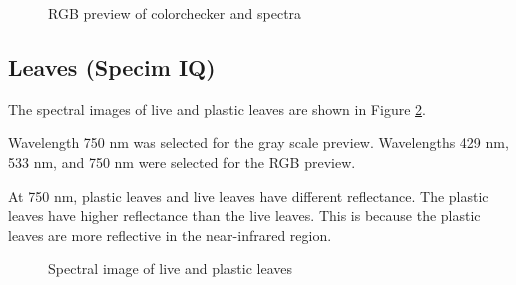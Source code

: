 \begin{figure}[H] %
  \centering
  \hspace{0.1cm}
  \caption[]{RGB preview of colorchecker and spectra }
  \label{fig:cc-rgb}
\end{figure}

\subsection{Leaves (Specim IQ)}

The spectral images of live and plastic leaves are shown in Figure
\ref{fig:leaves}.

Wavelength 750 nm was selected for the gray scale preview.
Wavelengths 429 nm, 533 nm, and 750 nm were selected for the RGB preview.

At 750 nm, plastic leaves and live leaves have different reflectance.
The plastic leaves have higher reflectance than the live leaves. This
is because the plastic leaves are more reflective in the near-infrared region.

\begin{figure}[H] %
  \centering
  \hspace{0.1cm}
  \caption[]{Spectral image of live and plastic leaves }
  \label{fig:leaves}
\end{figure}


